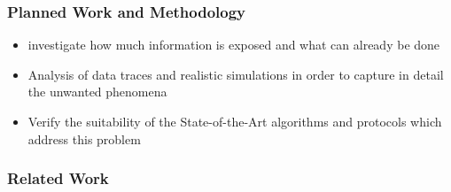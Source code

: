 \subsubsection{Planned Work and Methodology}

\begin{itemize}
	\item investigate how much information is exposed and what can already be done
	\item Analysis of data traces and realistic simulations in order to capture in detail the unwanted phenomena
	\item Verify the suitability of the State-of-the-Art algorithms and protocols which address this problem
\end{itemize}


\subsubsection{Related Work}

